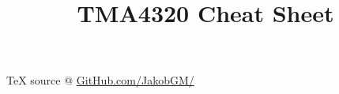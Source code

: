 \documentclass[6pt]{article}
\date{}
\title{TMA4320 Cheat Sheet}
\theoremstyle{definition}
\begin{document}
\begin{multicols*}{3}

\maketitle
TeX source @ \href{https://github.com/JakobGM/Numerical-Analysis-Cheat-Sheet}{GitHub.com/JakobGM/}






\end{multicols*}
\end{document}
